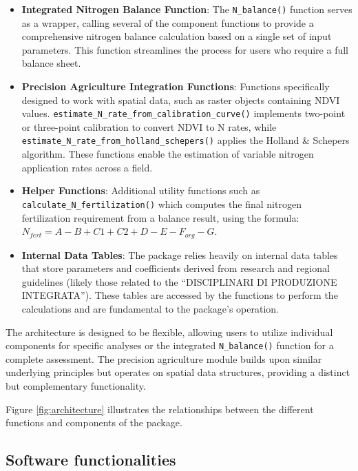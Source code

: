 \documentclass[
  11pt,
]{article}
\begin{document}
\begin{itemize}
\begin{itemize}
    \texttt{natural\_contribution()}: Estimates natural nitrogen inputs
    (e.g., atmospheric deposition) based on location and crop calendar
    period, using data from \texttt{g.table} and \texttt{coef\_time}.
  \end{itemize}
\item
  \textbf{Integrated Nitrogen Balance Function}: The
  \texttt{N\_balance()} function serves as a wrapper, calling several of
  the component functions to provide a comprehensive nitrogen balance
  calculation based on a single set of input parameters. This function
  streamlines the process for users who require a full balance sheet.
\item
  \textbf{Precision Agriculture Integration Functions}: Functions
  specifically designed to work with spatial data, such as raster
  objects containing NDVI values.
  \texttt{estimate\_N\_rate\_from\_calibration\_curve()} implements
  two-point or three-point calibration to convert NDVI to N rates, while
  \texttt{estimate\_N\_rate\_from\_holland\_schepers()} applies the
  Holland \& Schepers algorithm. These functions enable the estimation
  of variable nitrogen application rates across a field.
\item
  \textbf{Helper Functions}: Additional utility functions such as
  \texttt{calculate\_N\_fertilization()} which computes the final
  nitrogen fertilization requirement from a balance result, using the
  formula: \(N_{fert} = A - B + C1 + C2 + D - E - F_{org} - G\).
\item
  \textbf{Internal Data Tables}: The package relies heavily on internal
  data tables that store parameters and coefficients derived from
  research and regional guidelines (likely those related to the
  ``DISCIPLINARI DI PRODUZIONE INTEGRATA''). These tables are accessed
  by the functions to perform the calculations and are fundamental to
  the package's operation.
\end{itemize}

The architecture is designed to be flexible, allowing users to utilize
individual components for specific analyses or the integrated
\texttt{N\_balance()} function for a complete assessment. The precision
agriculture module builds upon similar underlying principles but
operates on spatial data structures, providing a distinct but
complementary functionality.

Figure \ref{fig:architecture} illustrates the relationships between the
different functions and components of the package.

\subsection{Software functionalities}\label{software-functionalities}
\end{document}
